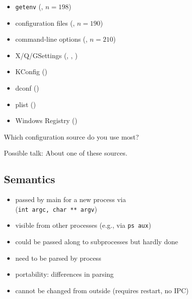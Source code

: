 \begin{frame}
	\methodQuestion{} 
	\begin{itemize}
	\item \texttt{getenv} (, $n=198$)
	\item configuration files (, $n=190$)
	\item command-line options (, $n=210$)
	\item X/Q/GSettings (, , )
	\item KConfig ()
	\item dconf ()
	\item plist ()
	\item Windows Registry ()
	\end{itemize}
\end{frame}

\begin{assignment}
	\begin{task}
	Which configuration source do you use most?
	\end{task}

	\begin{task}
	Possible talk: About one of these sources.
	\end{task}
\end{assignment}

\subsection{Semantics}

\begin{frame}
	\begin{itemize}
	\item passed by main for a new process via \\ (\texttt{int argc, char ** argv})
	\item visible from other processes (e.g., via \texttt{ps aux})
	\item could be passed along to subprocesses but hardly done
	\item need to be parsed by process
	\item portability: differences in parsing
	\item cannot be changed from outside (requires restart, no IPC)
	\end{itemize}
\end{frame}

